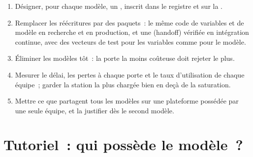 \begin{method}\label{met:ml:team:method}
\begin{enumerate}
\item Désigner, pour chaque modèle, un , inscrit dans le registre et sur la .
\item Remplacer les réécritures par des paquets~: le même code de variables et de modèle en recherche et en production, et une  (handoff)
vérifiée en intégration continue, avec des vecteurs de test pour les variables comme pour le modèle.
\item Éliminer les modèles tôt~: la porte la moins coûteuse doit rejeter le plus.
\item Mesurer le délai, les pertes à chaque porte et le taux d'utilisation de chaque équipe~; garder la station la plus chargée bien en deçà de la saturation.
\item Mettre ce que partagent tous les modèles sur une plateforme possédée par une seule équipe, et la justifier dès le second modèle.
\end{enumerate}
\end{method}

\section{Tutoriel~: qui possède le modèle~?}\label{tut:ml:the-machine-learning-team:tut}

